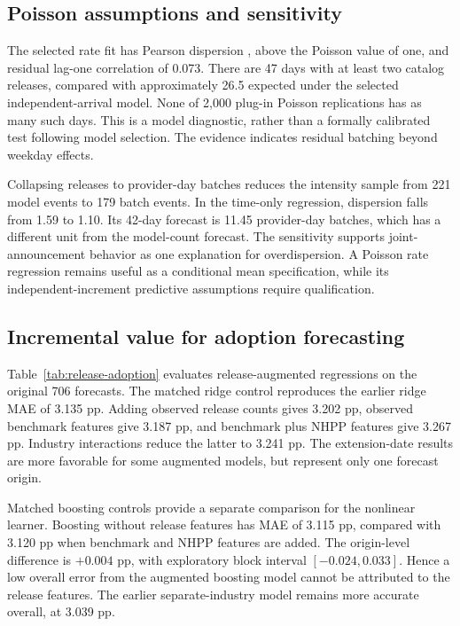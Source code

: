\subsection{Poisson assumptions and sensitivity}
The selected rate fit has Pearson dispersion \ReleaseDispersion{}, above the Poisson value of one, and residual lag-one correlation of 0.073. There are 47 days with at least two catalog releases, compared with approximately 26.5 expected under the selected independent-arrival model. None of 2,000 plug-in Poisson replications has as many such days. This is a model diagnostic, rather than a formally calibrated test following model selection. The evidence indicates residual batching beyond weekday effects.

Collapsing releases to provider-day batches reduces the intensity sample from 221 model events to 179 batch events. In the time-only regression, dispersion falls from 1.59 to 1.10. Its 42-day forecast is 11.45 provider-day batches, which has a different unit from the model-count forecast. The sensitivity supports joint-announcement behavior as one explanation for overdispersion. A Poisson rate regression remains useful as a conditional mean specification, while its independent-increment predictive assumptions require qualification.

\subsection{Incremental value for adoption forecasting}
Table~\ref{tab:release-adoption} evaluates release-augmented regressions on the original 706 forecasts. The matched ridge control reproduces the earlier ridge MAE of 3.135 pp. Adding observed release counts gives 3.202 pp, observed benchmark features give 3.187 pp, and benchmark plus NHPP features give 3.267 pp. Industry interactions reduce the latter to 3.241 pp. The extension-date results are more favorable for some augmented models, but represent only one forecast origin.



Matched boosting controls provide a separate comparison for the nonlinear learner. Boosting without release features has MAE of 3.115 pp, compared with 3.120 pp when benchmark and NHPP features are added. The origin-level difference is $+0.004$ pp, with exploratory block interval $[-0.024,0.033]$. Hence a low overall error from the augmented boosting model cannot be attributed to the release features. The earlier separate-industry model remains more accurate overall, at 3.039 pp.

